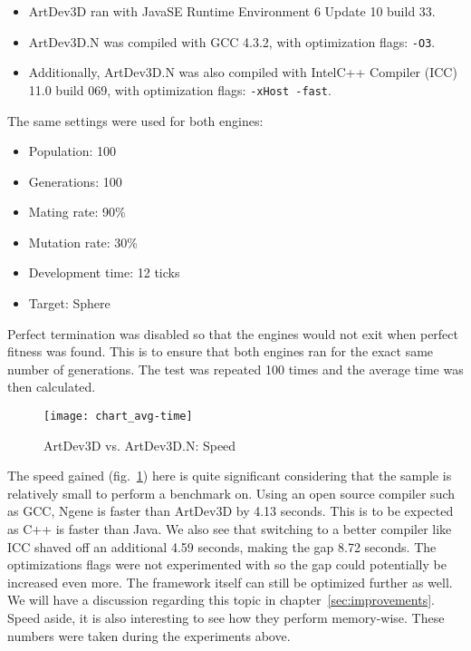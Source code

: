 \begin{itemize}
	\itemsep=0pt
	\item ArtDev3D ran with Java\texttrademark SE Runtime Environment 6 Update 10 build 33.
	\item ArtDev3D.N was compiled with GCC 4.3.2, with optimization flags: \texttt{-O3}.
	\item Additionally, ArtDev3D.N was also compiled with Intel\textregistered C++ Compiler (ICC) 11.0 build 069, with optimization flags: \texttt{-xHost -fast}.
\end{itemize}

\noindent The same settings were used for both engines:

\begin{itemize}
	\itemsep=-2pt
	\item Population: 100
	\item Generations: 100
	\item Mating rate: 90\%
	\item Mutation rate: 30\%
	\item Development time: 12 ticks
	\item Target: Sphere
\end{itemize}

\noindent Perfect termination was disabled so that the engines would not exit when perfect fitness was found. This is to ensure that both engines ran for the exact same number of generations. The test was repeated 100 times and the average time was then calculated.

\begin{figure}[!ht]
	\centering
	\texttt{[image: chart\_avg-time]}
	\caption{ArtDev3D vs. ArtDev3D.N: Speed}
	\label{fig:chart_avg-time}
\end{figure}

The speed gained (fig.~\ref{fig:chart_avg-time}) here is quite significant considering that the sample is relatively small to perform a benchmark on. Using an open source compiler such as GCC, Ngene is faster than ArtDev3D by 4.13 seconds. This is to be expected as C++ is faster than Java. We also see that switching to a better compiler like ICC shaved off an additional 4.59 seconds, making the gap 8.72 seconds. The optimizations flags were not experimented with so the gap could potentially be increased even more. The framework itself can still be optimized further as well. We will have a discussion regarding this topic in chapter~\ref{sec:improvements}. Speed aside, it is also interesting to see how they perform memory-wise. These numbers were taken during the experiments above.

